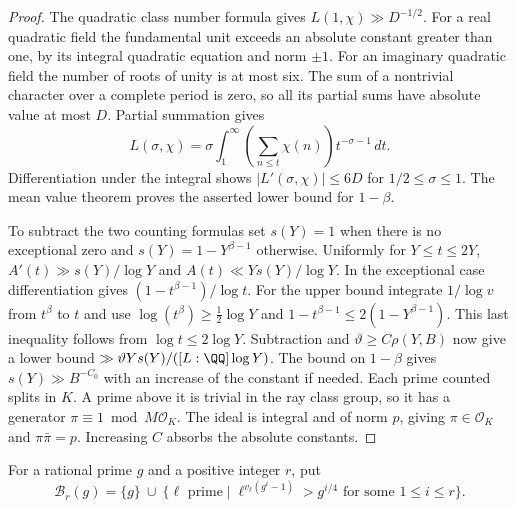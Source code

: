 \documentclass[a4paper,11pt]{article}
\theoremstyle{definition}
\theoremstyle{remark}
\numberwithin{equation}{section}
\begin{document}
\begin{proof}
The quadratic class number formula gives
\(L(1,\chi)\gg D^{-1/2}\). For a real quadratic field the
fundamental unit exceeds an absolute constant greater than one,
by its integral quadratic equation and norm \(\pm1\). For an
imaginary quadratic field the number of roots of unity is at
most six. The sum of a nontrivial character over a complete
period is zero, so all its partial sums have absolute value at
most \(D\). Partial summation gives
\[
 L(\sigma,\chi)=\sigma\int_1^\infty
         \left(\sum_{n\le t}\chi(n)\right)t^{-\sigma-1}\,dt .
\]
Differentiation under the integral shows
\(|L'(\sigma,\chi)|\le6D\) for \(1/2\le\sigma\le1\).
The mean value theorem proves the asserted lower bound for
\(1-\beta\).

To subtract the two counting formulas set \(s(Y)=1\) when
there is no exceptional zero and \(s(Y)=1-Y^{\beta-1}\)
otherwise. Uniformly for \(Y\le t\le2Y\),
\(A'(t)\gg s(Y)/\log Y\) and \(A(t)\ll Ys(Y)/\log Y\).
In the exceptional case differentiation gives
\((1-t^{\beta-1})/\log t\). For the upper bound integrate
\(1/\log v\) from \(t^\beta\) to \(t\) and use
\(\log(t^\beta)\ge\frac12\log Y\) and
\(1-t^{\beta-1}\le2(1-Y^{\beta-1})\). This last inequality
follows from \(\log t\le2\log Y\). Subtraction and
\(\vartheta\ge C\rho(Y,B)\) now give a lower bound
\(\gg\vartheta Ys(Y)/([L:\QQ]\log Y)\).
The bound on \(1-\beta\) gives \(s(Y)\gg B^{-C_0}\) with an
increase of the constant if needed. Each prime counted splits
in \(K\). A prime above it is trivial in the ray class group,
so it has a generator \(\pi\equiv1\bmod M\mathcal O_K\). The ideal
is integral and of norm \(p\), giving
\(\pi\in\mathcal O_K\) and \(\pi\bar\pi=p\). Increasing \(C\) absorbs
the absolute constants.
\end{proof}

For a rational prime \(g\) and a positive integer \(r\), put
\[
 \mathcal B_r(g)=\{g\}\ \cup\
  \{\ell\text{ prime}\mid
       \ell^{v_\ell(g^i-1)}>g^{i/4}
              \text{ for some }1\le i\le r\}.
\]
\end{document}

